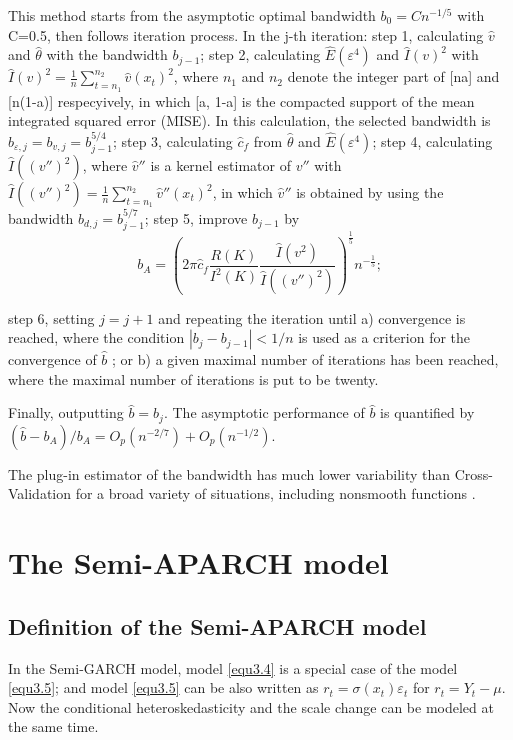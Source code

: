This method starts from the asymptotic optimal bandwidth $b_{0}= Cn^{-1/5}$ with C=0.5, then follows iteration process. In the j-th iteration: step 1, calculating $\hat{v}$ and $\hat{\theta}$ with the bandwidth $b_{j-1}$; step 2, calculating $\hat{E}(\varepsilon^{4})$ and $\hat{I}(v)^{2}$ with  $\hat{I}(v)^{2} = \frac{1}{n}\sum_{t=n_{1}}^{n_{2}}\hat{v}(x_{t})^{2}$, where $n_{1}$ and $n_{2}$ denote the integer part of [na] and [n(1-a)] respecyively, in which [a, 1-a] is the compacted support of the mean integrated squared error (MISE). In this calculation, the selected bandwidth is $b_{\varepsilon,j}=b_{v,j}=b_{j-1}^{5/4}$; step 3, calculating $\hat{c}_{f}$ from $\hat{\theta}$ and $\hat{E}(\varepsilon^{4})$; step 4, calculating $\hat{I}((v'')^{2})$, where $\hat{v}''$ is a kernel estimator of  $v''$ with $\hat{I}((v'')^{2})= \frac{1}{n}\sum_{t=n_{1}}^{n_{2}}\hat{v}''(x_{t})^{2}$, in which $\hat{v}''$ is obtained by using the bandwidth $b_{d,j}=b_{j-1}^{5/7}$; step 5, improve $b_{j-1}$ by 
\[ b_{A} =(2\pi \hat{c}_{f} \frac{R(K)}{I^{2}(K)}\frac{\hat{I}(v^{2})}{\hat{I}((v'')^2)})^{\frac{1}{5}}n^{-\frac{1}{5}}; \]

step 6, setting $j=j+1$ and repeating the iteration until a) convergence is reached, where the condition $|b_{j} - b_{j-1}| <1/n$ is used as a criterion for the convergence of $\hat{b}$ ; or b) a given maximal number of iterations has been reached, where the maximal number of iterations is put to be twenty. 

Finally, outputting $\hat{b} = b_{j}$. The asymptotic performance of $\hat{b}$ is quantified by $(\hat{b}-b_{A})/b_{A}=O_{p}(n^{-2/7})+O_{p}(n^{-1/2})$.

The plug-in estimator of the bandwidth has much lower variability than Cross- Validation for a broad variety of situations, including nonsmooth functions \citep{Gasser1991,Feng2004}.

\section{The Semi-APARCH model}
\subsection{Definition of the Semi-APARCH model}

In the Semi-GARCH model, model \ref{equ3.4} is a special case of the model \ref{equ3.5}; and model \ref{equ3.5} can be also written as $r_t= \sigma(x_t)\varepsilon_t$ for $ r_{t}=Y_{t}-\mu$. Now the conditional heteroskedasticity and the scale change can be modeled at the same time.

